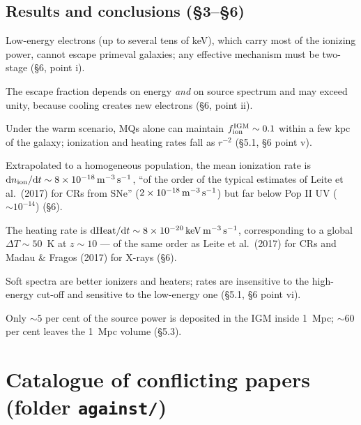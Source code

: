 \documentclass[11pt,a4paper]{article}
\begin{document}
\subsection{Results and conclusions (\S3--\S6)}

\begin{description}[leftmargin=1.6cm,style=nextline,itemsep=3pt]
\item[\textbf{R1}] Low-energy electrons (up to several tens of keV), which carry
  most of the ionizing power, cannot escape primeval galaxies; any effective
  mechanism must be two-stage (\S6, point i).
\item[\textbf{R2}] The escape fraction depends on energy \emph{and} on source
  spectrum and may exceed unity, because cooling creates new electrons
  (\S6, point ii).
\item[\textbf{R3}] Under the warm scenario, MQs alone can maintain
  $f_{\rm ion}^{\rm IGM}\sim0.1$ within a few kpc of the galaxy; ionization and
  heating rates fall as $r^{-2}$ (\S5.1, \S6 point v).
\item[\textbf{R4}] Extrapolated to a homogeneous population, the mean ionization
  rate is ${\rm d}n_{\rm ion}/{\rm d}t\sim8\times10^{-18}\,{\rm m^{-3}\,s^{-1}}$,
  ``of the order of the typical estimates of Leite et al.\ (2017) for CRs from
  SNe'' ($2\times10^{-18}\,{\rm m^{-3}\,s^{-1}}$) but far below Pop II UV
  ($\sim10^{-14}$) (\S6).
\item[\textbf{R5}] The heating rate is
  ${\rm d}{\rm Heat}/{\rm d}t\sim8\times10^{-20}\,{\rm keV\,m^{-3}\,s^{-1}}$,
  corresponding to a global $\Delta T\sim50$~K at $z\sim10$ --- of the same
  order as Leite et al.\ (2017) for CRs and Madau \& Fragos (2017) for X-rays
  (\S6).
\item[\textbf{R6}] Soft spectra are better ionizers and heaters; rates are
  insensitive to the high-energy cut-off and sensitive to the low-energy one
  (\S5.1, \S6 point vi).
\item[\textbf{R7}] Only $\sim5$ per cent of the source power is deposited in the
  IGM inside 1~Mpc; $\sim60$ per cent leaves the 1~Mpc volume (\S5.3).
\end{description}

\section{Catalogue of conflicting papers (folder \texttt{against/})}
\end{document}
